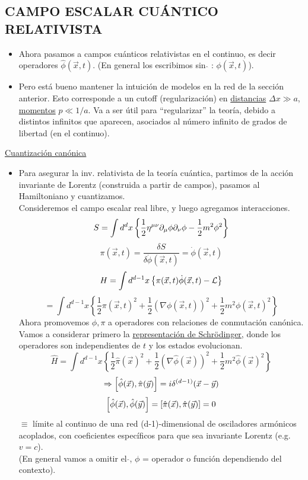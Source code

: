\vspace{0.5cm}
\subsection{CAMPO ESCALAR CUÁNTICO RELATIVISTA}
\begin{itemize}
    \item Ahora pasamos a campos cuánticos relativistas en el continuo, es decir operadores $\hat{\phi}(\vec{x},t)$. (En general los escribimos sin $\hat{}$ : $\phi(\vec{x},t)$).
    \item Pero está bueno mantener la intuición de modelos en la red de la sección anterior. Esto corresponde a un cutoff (regularización) en \underline{distancias} $\Delta x \gg a$, \underline{momentos} $p \ll 1/a$. Va a ser útil para ``regularizar'' la teoría, debido a distintos infinitos que aparecen, asociados al número infinito de grados de libertad (en el continuo).
\end{itemize}

\vspace{0.5cm}
\noindent \underline{Cuantización canónica}
\begin{itemize}
    \item Para asegurar la inv. relativista de la teoría cuántica, partimos de la acción invariante de Lorentz (construida a partir de campos), pasamos al Hamiltoniano y cuantizamos. \\
          Consideremos el campo escalar real libre, y luego agregamos interacciones.
          $$ S = \int d^dx \left\{ \frac{1}{2} \eta^{\mu\nu} \partial_\mu \phi \partial_\nu \phi - \frac{1}{2} m^2 \phi^2 \right\} $$
          $$ \pi(\vec{x},t) = \frac{\delta S}{\delta \dot{\phi}(\vec{x},t)} = \dot{\phi}(\vec{x},t) $$
          $$ H = \int d^{d-1}x \left\{ \pi(\vec{x},t) \dot{\phi}(\vec{x},t) - \mathcal{L} \right\} $$
          $$ = \int d^{d-1}x \left\{ \frac{1}{2} \pi(\vec{x},t)^2 + \frac{1}{2} (\nabla \phi(\vec{x},t))^2 + \frac{1}{2} m^2 \phi(\vec{x},t)^2 \right\} $$
          Ahora promovemos $\phi, \pi$ a operadores con relaciones de conmutación canónica. Vamos a considerar primero la \underline{representación de Schrödinger}, donde los operadores son independientes de $t$ y los estados evolucionan.
          $$ \hat{H} = \int d^{d-1}x \left\{ \frac{1}{2} \hat{\pi}(\vec{x})^2 + \frac{1}{2} (\nabla \hat{\phi}(\vec{x}))^2 + \frac{1}{2} m^2 \hat{\phi}(\vec{x})^2 \right\} $$
          $$ \Rightarrow \comm{\hat{\phi}(\vec{x})}{\hat{\pi}(\vec{y})} = i \delta^{(d-1)}(\vec{x}-\vec{y}) $$
          $$ \comm{\hat{\phi}(\vec{x})}{\hat{\phi}(\vec{y})} = \comm{\hat{\pi}(\vec{x})}{\hat{\pi}(\vec{y})} = 0 $$
          \noindent $\equiv$ límite al continuo de una red (d-1)-dimensional de osciladores armónicos acoplados, con coeficientes específicos para que sea invariante Lorentz (e.g. $v=c$). \\
          (En general vamos a omitir el $\hat{}$, $\phi$ = operador o función dependiendo del contexto).

\end{itemize}

